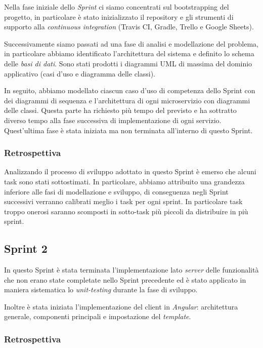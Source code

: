 Nella fase iniziale dello \textit{Sprint} ci siamo concentrati sul bootstrapping del progetto, in particolare è stato inizializzato il repository e gli strumenti di supporto alla \textit{continuous integration} (Travis CI, Gradle, Trello e Google Sheets).

Successivamente siamo passati ad una fase di analisi e modellazione del problema, in particolare abbiamo identificato l'architettura del sistema e definito lo schema delle \textit{basi di dati}.
%
Sono stati prodotti i diagrammi UML di massima del dominio applicativo (casi d'uso e diagramma delle classi).

In seguito, abbiamo modellato ciascun caso d'uso di competenza dello Sprint con dei diagrammi di sequenza e l'architettura di ogni microservizio con diagrammi delle classi. Questa parte ha richiesto più tempo del previsto e ha sottratto diverso tempo alla fase successiva di implementazione di ogni servizio.
%
Quest'ultima fase è stata iniziata ma non terminata all'interno di questo Sprint.

\subsubsection{Retrospettiva}

Analizzando il processo di sviluppo adottato in questo Sprint è emerso che alcuni task sono stati sottostimati.
%
In particolare, abbiamo attribuito una grandezza inferiore alle fasi di modellazione e sviluppo, di conseguenza negli Sprint successivi verranno calibrati meglio i task per ogni sprint. In particolare task troppo onerosi saranno scomposti in sotto-task più piccoli da distribuire in più sprint.

\subsection{Sprint 2}

In questo Sprint è stata terminata l'implementazione lato \textit{server} delle funzionalità che non erano state completate nello Sprint precedente ed è stato applicato in maniera sistematica lo \textit{unit-testing} durante la fase di sviluppo.

Inoltre è stata iniziata l'implementazione del client in \textit{Angular}: architettura generale, componenti principali e impostazione del \textit{template}.

\subsubsection{Retrospettiva}

